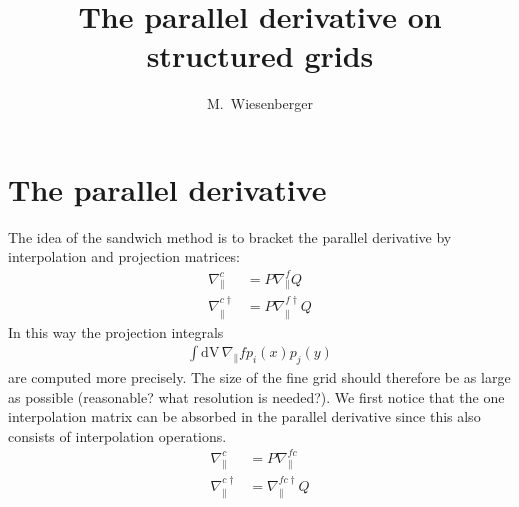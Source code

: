 \documentclass{hitec} %
\newcommand{\dV}{\mathrm{dV}\,}
\begin{document}

\title{The parallel derivative on structured grids}
\author{M.~Wiesenberger}
 
\maketitle
\section{The parallel derivative}
The idea of the sandwich method is to bracket the parallel derivative by interpolation and projection matrices:
\begin{align}
    \nabla^c_\parallel &= P\nabla_\parallel^f Q \\
    \nabla^{c\dagger}_\parallel &= P \nabla^{f\dagger}_\parallel Q
    \label{eq:sandwich}
\end{align}
In this way the projection integrals
\begin{align}
    \int\dV \nabla_\parallel f p_i(x)p_j(y) 
    \label{}
\end{align}
are computed more precisely.
The size of the fine grid should therefore be as large as
possible (reasonable? what resolution is needed?).
We first notice that the one interpolation matrix can be absorbed
in the parallel derivative since this also consists of 
interpolation operations. 
\begin{align}
    \nabla^c_\parallel &= P\nabla_\parallel^{fc} \\
    \nabla^{c\dagger}_\parallel &= \nabla^{fc\dagger}_\parallel Q
    \label{eq:sandwich}
\end{align}
\end{document}
